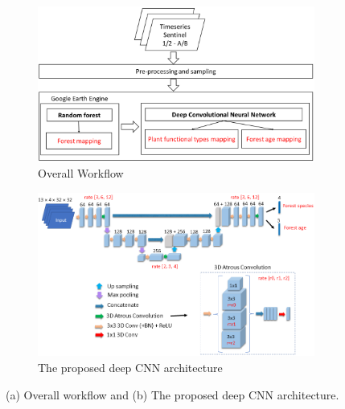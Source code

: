 \begin{figure}[p]
    \centering
    \begin{subfigure}{\textwidth}
        \centering
        \includegraphics[width=\textwidth]{figs/chap5/workflow.png}
        \caption{Overall Workflow}
        \label{fig:chap5_workflow}
    \end{subfigure}

    \begin{subfigure}{\textwidth}
        \centering
        \includegraphics[width=\textwidth]{figs/chap5/model.png}
        \caption{The proposed deep CNN architecture}
        \label{fig:chap5_model}
    \end{subfigure}
    \caption[Workflow and the proposed CNN architecture]{(a) Overall workflow and (b) The proposed deep CNN architecture.}
    \label{fig:chap5_workflow_model}
\end{figure}

